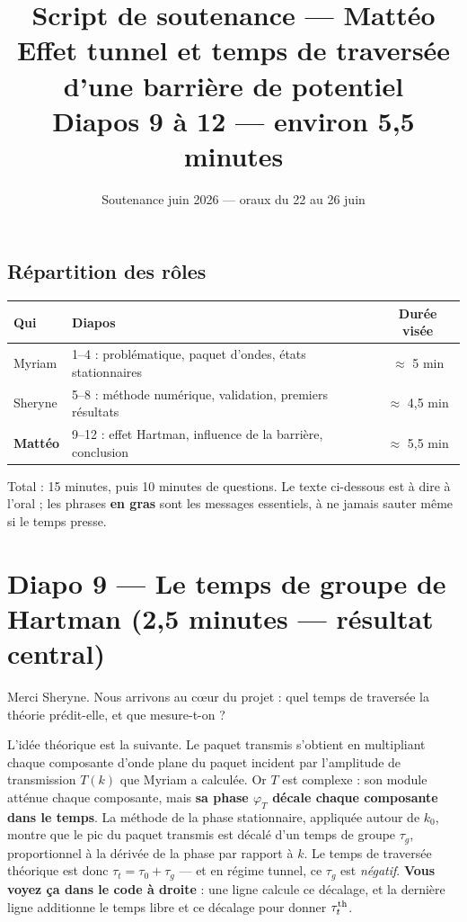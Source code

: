 \documentclass[11pt,a4paper]{article}
\title{\textbf{Script de soutenance --- Mattéo}\\
\large Effet tunnel et temps de traversée d'une barrière de potentiel\\
\normalsize Diapos 9 à 12 --- environ 5,5 minutes}
\author{}
\date{Soutenance juin 2026 --- oraux du 22 au 26 juin}
\newcommand{\diapo}[2]{\section*{Diapo #1 --- #2}}
\begin{document}
\maketitle

\subsection*{Répartition des rôles}

\begin{center}
\begin{tabular}{llc}
\toprule
Qui & Diapos & Durée visée \\
\midrule
Myriam & 1--4 : problématique, paquet d'ondes, états stationnaires & $\approx$ 5 min \\
Sheryne & 5--8 : méthode numérique, validation, premiers résultats & $\approx$ 4,5 min \\
\textbf{Mattéo} & 9--12 : effet Hartman, influence de la barrière, conclusion & $\approx$ 5,5 min \\
\bottomrule
\end{tabular}
\end{center}


Total : 15 minutes, puis 10 minutes de questions. Le texte ci-dessous est à dire
à l'oral ; les phrases \textbf{en gras} sont les messages essentiels, à ne jamais
sauter même si le temps presse.

\diapo{9}{Le temps de groupe de Hartman (2,5 minutes --- résultat central)}

Merci Sheryne. Nous arrivons au c\oe ur du projet : quel temps de traversée la
théorie prédit-elle, et que mesure-t-on ?

L'idée théorique est la suivante. Le paquet transmis s'obtient en multipliant
chaque composante d'onde plane du paquet incident par l'amplitude de transmission
$T(k)$ que Myriam a calculée. Or $T$ est complexe : son module atténue chaque
composante, mais \textbf{sa phase $\varphi_T$ décale chaque composante dans le
temps}. La méthode de la phase stationnaire, appliquée autour de $k_0$, montre
que le pic du paquet transmis est décalé d'un temps de groupe $\tau_g$,
proportionnel à la dérivée de la phase par rapport à $k$. Le temps de traversée
théorique est donc $\tau_t = \tau_0 + \tau_g$ --- et en régime tunnel, ce
$\tau_g$ est \emph{négatif}. \textbf{Vous voyez ça dans le code à droite} : une
ligne calcule ce décalage, et la dernière ligne additionne le temps libre et
ce décalage pour donner $\tau_t^{\rm th}$.
\end{document}

